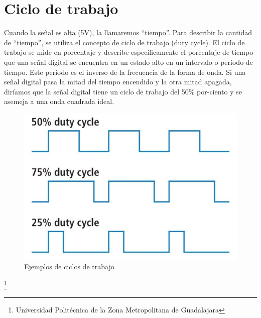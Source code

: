 \documentclass[12pt,a4paper]{article}
\begin{document}
\section{Ciclo de trabajo}
Cuando la señal es alta (5V), la llamaremos “tiempo”. Para describir la cantidad de “tiempo”, se utiliza el concepto de ciclo de trabajo (duty cycle). El ciclo de trabajo se mide en porcentaje y describe específicamente el porcentaje de tiempo que una señal digital se encuentra en un estado alto en un intervalo o período de tiempo. Este período es el inverso de la frecuencia de la forma de onda. Si una señal digital pasa la mitad del tiempo encendido y la otra mitad apagada, diríamos que la señal digital tiene un ciclo de trabajo del 50\% por-ciento y se asemeja a una onda cuadrada ideal.\\
\begin{figure}[hbtp]
\centering
\includegraphics[scale=0.6]{Pictures/Ciclos.jpg}
\caption{Ejemplos de ciclos de trabajo}
\end{figure}
\footnote{Universidad Politécnica de la Zona Metropolitana de Guadalajara}

\newpage
\end{document}
